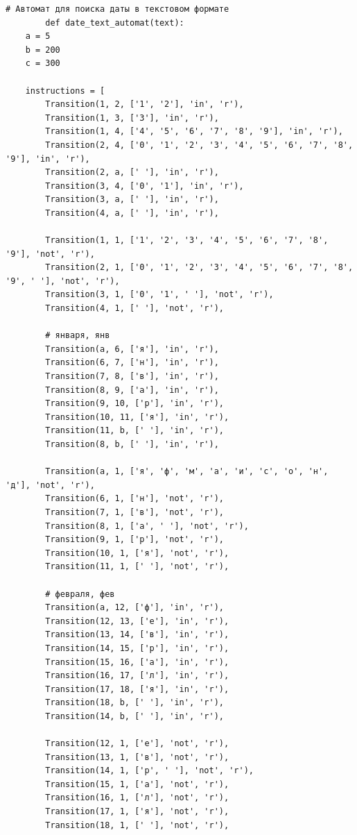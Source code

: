 \documentclass[a4paper, 14pt]{article}
\begin{document}
		\begin{lstlisting}[label=some-code,caption=Автомат для поиска даты в текстовом формате]
		# Автомат для поиска даты в текстовом формате
		def date_text_automat(text):
    a = 5
    b = 200
    c = 300

    instructions = [
        Transition(1, 2, ['1', '2'], 'in', 'r'),
        Transition(1, 3, ['3'], 'in', 'r'),
        Transition(1, 4, ['4', '5', '6', '7', '8', '9'], 'in', 'r'),
        Transition(2, 4, ['0', '1', '2', '3', '4', '5', '6', '7', '8', '9'], 'in', 'r'),
        Transition(2, a, [' '], 'in', 'r'),
        Transition(3, 4, ['0', '1'], 'in', 'r'),
        Transition(3, a, [' '], 'in', 'r'),
        Transition(4, a, [' '], 'in', 'r'),

        Transition(1, 1, ['1', '2', '3', '4', '5', '6', '7', '8', '9'], 'not', 'r'),
        Transition(2, 1, ['0', '1', '2', '3', '4', '5', '6', '7', '8', '9', ' '], 'not', 'r'),
        Transition(3, 1, ['0', '1', ' '], 'not', 'r'),
        Transition(4, 1, [' '], 'not', 'r'),

        # января, янв
        Transition(a, 6, ['я'], 'in', 'r'),
        Transition(6, 7, ['н'], 'in', 'r'),
        Transition(7, 8, ['в'], 'in', 'r'),
        Transition(8, 9, ['а'], 'in', 'r'),
        Transition(9, 10, ['р'], 'in', 'r'),
        Transition(10, 11, ['я'], 'in', 'r'),
        Transition(11, b, [' '], 'in', 'r'),
        Transition(8, b, [' '], 'in', 'r'),

        Transition(a, 1, ['я', 'ф', 'м', 'а', 'и', 'с', 'о', 'н', 'д'], 'not', 'r'),
        Transition(6, 1, ['н'], 'not', 'r'),
        Transition(7, 1, ['в'], 'not', 'r'),
        Transition(8, 1, ['а', ' '], 'not', 'r'),
        Transition(9, 1, ['р'], 'not', 'r'),
        Transition(10, 1, ['я'], 'not', 'r'),
        Transition(11, 1, [' '], 'not', 'r'),

        # февраля, фев
        Transition(a, 12, ['ф'], 'in', 'r'),
        Transition(12, 13, ['е'], 'in', 'r'),
        Transition(13, 14, ['в'], 'in', 'r'),
        Transition(14, 15, ['р'], 'in', 'r'),
        Transition(15, 16, ['а'], 'in', 'r'),
        Transition(16, 17, ['л'], 'in', 'r'),
        Transition(17, 18, ['я'], 'in', 'r'),
        Transition(18, b, [' '], 'in', 'r'),
        Transition(14, b, [' '], 'in', 'r'),

        Transition(12, 1, ['е'], 'not', 'r'),
        Transition(13, 1, ['в'], 'not', 'r'),
        Transition(14, 1, ['р', ' '], 'not', 'r'),
        Transition(15, 1, ['а'], 'not', 'r'),
        Transition(16, 1, ['л'], 'not', 'r'),
        Transition(17, 1, ['я'], 'not', 'r'),
        Transition(18, 1, [' '], 'not', 'r'),


\end{lstlisting}
\end{document}
